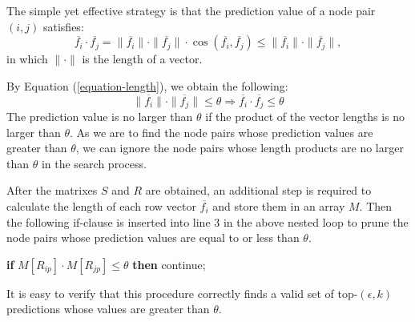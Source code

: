 The simple yet effective strategy is that the prediction value of a node pair $(i, j)$ satisfies:
\begin{equation}
\label{equation-length}
\overline{f_i} \cdot \overline{f_j} = \|\overline{f_i} \| \cdot \| \overline{f_j} \| \cdot
\cos(\overline{f_i}, \overline{f_j}) \leq \|\overline{f_i} \| \cdot \| \overline{f_j} \|,
\end{equation} in which $\|\cdot\|$ is the length of a vector.

By Equation (\ref{equation-length}), we obtain the following:
\begin{equation}
\label{equation-length-pruning}
\|\overline{f_i} \| \cdot \| \overline{f_j} \| \leq \theta \Longrightarrow \overline{f_i} \cdot \overline{f_j} \leq \theta
\end{equation}
The prediction value is no larger than $\theta$ if the product of the vector lengths  is no larger than $\theta$.
As we are to find the node pairs whose prediction values are greater than $\theta$, we can ignore
the node pairs whose length products are no larger than $\theta$ in the search process.

After  the matrixes $S$ and $R$ are obtained, an additional step is required to calculate the length of each row
vector $\overline{f_i}$ and store them in an array $M$. Then the following if-clause is inserted  into line 3
in the above nested loop to prune the node pairs whose prediction values are equal to or less than $\theta$.
\begin{tabbing}\hspace{5ex}\=
{\bf if} $M[R_{ip}] \cdot M[R_{jp}] \leq \theta$ {\bf then} continue;
\end{tabbing}


It is easy to verify that this procedure correctly finds a valid set of top-$(\epsilon, k)$
predictions whose values are greater than $\theta$. 




